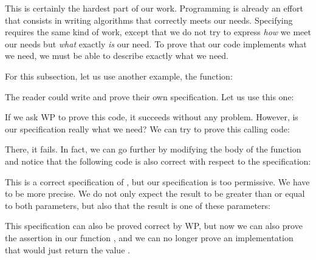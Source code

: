 


This is certainly the hardest part of our work. Programming is already
an effort that consists in writing algorithms that correctly meets
our needs. Specifying requires the same kind of work, except that we do
not try to express \emph{how} we meet our needs but \emph{what}
exactly \emph{is} our need. To prove that our code implements what we need, we
must be able to describe exactly what we need.

For this subsection, let us use another example, the  function:






The reader could write and prove their own specification. Let us
use this one:






If we ask WP to prove this code, it succeeds without any problem.
However, is our specification really what we need? We can try to prove this
calling code:






There, it fails. In fact, we can go further by modifying the body of
the  function and notice that the following code is also
correct with respect to the specification:






This is a correct specification of , but our specification
is too permissive. We have to be more precise. We do
not only expect the result to be greater than or equal to both parameters,
but also that the result is one of these parameters:





This specification can also be proved correct by WP, but now we can also prove
the assertion in our function , and we can no longer prove an
implementation that would just return the value .




